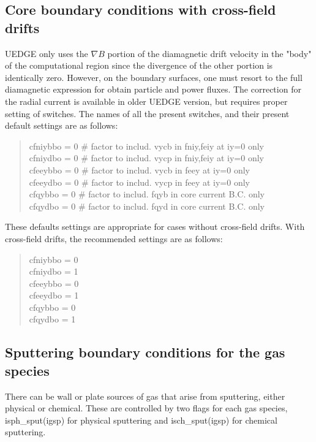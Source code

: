 \documentclass [12pt]{article}
\begin{document}
\subsection{Core boundary conditions with cross-field drifts}

UEDGE only uses the $\nabla B$ portion of the diamagnetic drift velocity in
the "body" of the computational region since the divergence of the other
portion is identically zero.  However, on the boundary surfaces, one must
resort to the full diamagnetic expression for obtain particle and power
fluxes.  The correction for the radial current is available in older UEDGE
version, but requires proper setting of switches.  The names of all the
present switches, and their present default settings are as follows:
\begin{verse} \sf
   cfniybbo = 0   \# factor to includ. vycb in fniy,feiy at iy=0 only\\
   cfniydbo = 0   \# factor to includ. vycp in fniy,feiy at iy=0 only\\
   cfeeybbo = 0   \# factor to includ. vycb in feey at iy=0 only\\
   cfeeydbo = 0   \# factor to includ. vycp in feey at iy=0 only\\
   cfqybbo  = 0   \# factor to includ. fqyb in core current B.C. only\\
   cfqydbo  = 0   \# factor to includ. fqyd in core current B.C. only
\end{verse}
These defaults settings are appropriate for cases without cross-field drifts.
With cross-field drifts, the recommended settings are as follows:
\begin{verse} \sf
   cfniybbo = 0\\
   cfniydbo = 1\\
   cfeeybbo = 0\\
   cfeeydbo = 1\\
   cfqybbo = 0\\
   cfqydbo = 1
\end{verse}

\subsection{Sputtering boundary conditions for the gas species}
\label{sputsec}

There can be wall or plate sources of gas that arise from sputtering, either
physical or chemical.  These are controlled by two flags for each gas species,
{\sf isph\_sput(igsp)} for physical sputtering and {\sf isch\_sput(igsp)} for
chemical sputtering.
\end{document}
